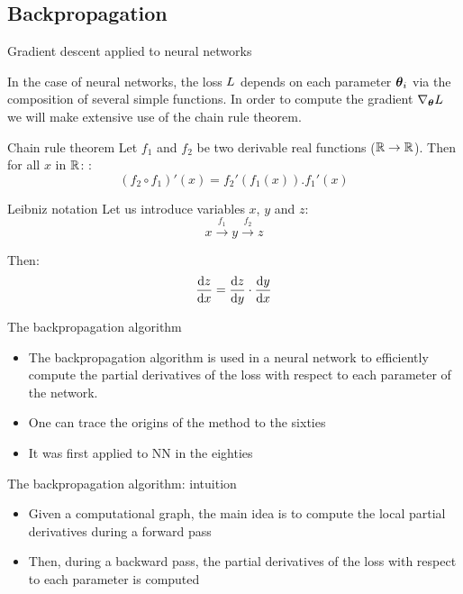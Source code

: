 \documentclass[xcolor=pdftex,dvipsnames,table,mathserif]{beamer}
\begin{document}
\subsection{Backpropagation}


\begin{frame}{Gradient descent applied to neural networks}

  In the case of neural networks, the loss $L$ depends on each parameter $\boldsymbol{\theta}_i$ via the composition of several simple functions. In order to compute the gradient $\nabla_{\boldsymbol{\theta}}L$ we will make extensive use of the chain rule theorem.

  \begin{block}{Chain rule theorem}
    Let $f_1$ and $f_2$ be two derivable real functions ($\mathbb{R} \rightarrow \mathbb{R}$). Then for all $x$ in $\mathbb{R}$:   :
    \[
    (f_2 \circ f_1)'(x) = f_2'(f_1(x)).f_1'(x)
    \]
  \end{block}


  \begin{block}{Leibniz notation}
    Let us introduce variables $x$, $y$ and $z$:
    \[x \xrightarrow{f_1} y \xrightarrow{f_2} z\]

    Then:
    \[\dv{z}{x} = \dv{z}{y} \cdot \dv{y}{x} \]

  \end{block}

\end{frame}


\begin{frame}{The backpropagation algorithm}

  \begin{itemize}
  \item The backpropagation algorithm is used in a neural network to efficiently compute the partial derivatives of the loss with respect to each parameter of the network.
  \item One can trace the origins of the method to the sixties
  \item It was first applied to NN in the eighties \cite{werbos_applications_1982, lecun_procedure_1985}
  \end{itemize}


\end{frame}


\begin{frame}{The backpropagation algorithm: intuition}

  \begin{itemize}
  \item Given a computational graph, the main idea is to compute the local partial derivatives during a forward pass
  \item Then, during a backward pass, the partial derivatives of the loss with respect to each parameter is computed
  \end{itemize}


\end{frame}
\end{document}
